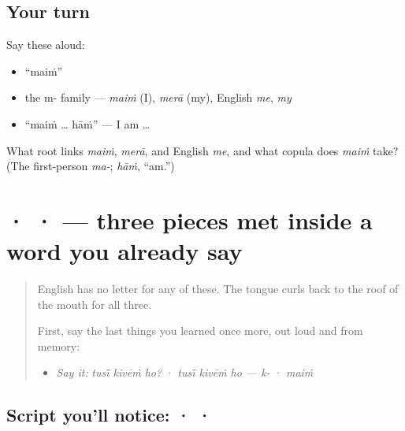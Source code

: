 \subsection*{Your turn}
Say these aloud:

\begin{itemize}
\raggedright
  \item \textquotedblleft{}maiṁ\textquotedblright{}
  \item the m- family — \emph{maiṁ} (I), \emph{merā} (my), English \emph{me}, \emph{my}
  \item \textquotedblleft{}maiṁ … hāṁ\textquotedblright{} — I am …
\end{itemize}

\begin{tcolorbox}[breakable,colback=teal!4,colframe=teal!35!black,title={Before you move on}]
What root links \emph{maiṁ}, \emph{merā}, and English \emph{me}, and what copula does \emph{maiṁ} take? (The first-person \emph{ma-}; \emph{hāṁ}, \textquotedblleft{}am.\textquotedblright{})
\end{tcolorbox}
\section[\texorpdfstring{\pa{ਟ} · \pa{ਠ} · \pa{ਡ} (ṭa · ṭha · ḍa)}{ਟ · ਠ · ਡ (ṭa · ṭha · ḍa)}]{ ·  ·  — three pieces met inside a word you already say}

\label{lesson:PA-S03-retroflex-row}



\begin{quote}
English has no letter for any of these. The tongue curls back to the roof of the mouth for all three.

First, say the last things you learned once more, out loud and from memory:

\begin{itemize}
\raggedright
  \item \emph{Say it:} \emph{tusī̃ kivēṁ ho?} · \emph{tusī̃ kivēṁ ho — k-} · \emph{maiṁ}
\end{itemize}
\end{quote}

\subsection*{Script you'll notice:  ·  · }
\begin{quote}
\end{quote}

